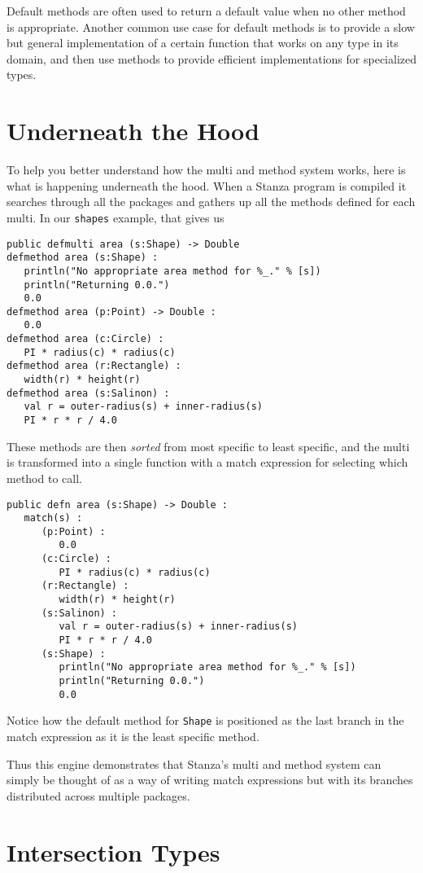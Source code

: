\documentclass[10pt,oneside]{book}
\begin{document}
Default methods are often used to return a default value when no other method is appropriate. Another common use case for default methods is to provide a slow but general implementation of a certain function that works on any type in its domain, and then use methods to provide efficient implementations for specialized types. 

\section{Underneath the Hood}
To help you better understand how the multi and method system works, here is what is happening underneath the hood. When a Stanza program is compiled it searches through all the packages and gathers up all the methods defined for each multi. In our \texttt{\frenchspacing shapes} example, that gives us
\begin{lstlisting}
public defmulti area (s:Shape) -> Double
defmethod area (s:Shape) :
   println("No appropriate area method for %_." % [s])
   println("Returning 0.0.")
   0.0
defmethod area (p:Point) -> Double :
   0.0
defmethod area (c:Circle) :
   PI * radius(c) * radius(c)
defmethod area (r:Rectangle) :
   width(r) * height(r)
defmethod area (s:Salinon) :
   val r = outer-radius(s) + inner-radius(s)
   PI * r * r / 4.0
\end{lstlisting}
These methods are then {\em sorted} from most specific to least specific, and the multi is transformed into a single function with a match expression for selecting which method to call.
\begin{lstlisting}
public defn area (s:Shape) -> Double :
   match(s) :
      (p:Point) :
         0.0
      (c:Circle) :
         PI * radius(c) * radius(c)
      (r:Rectangle) :
         width(r) * height(r)
      (s:Salinon) :
         val r = outer-radius(s) + inner-radius(s)
         PI * r * r / 4.0
      (s:Shape) :
         println("No appropriate area method for %_." % [s])
         println("Returning 0.0.")
         0.0
\end{lstlisting}
Notice how the default method for \texttt{\frenchspacing Shape} is positioned as the last branch in the match expression as it is the least specific method. 

Thus this engine demonstrates that Stanza's multi and method system can simply be thought of as a way of writing match expressions but with its branches distributed across multiple packages.

\section{Intersection Types}
\end{document}
